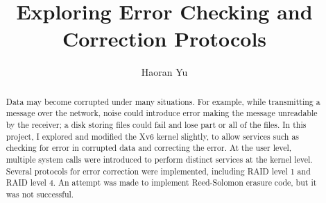 \documentclass[manuscript, review, screen]{acmart}
\begin{document}
\title{Exploring Error Checking and Correction Protocols} 


\author{Haoran Yu}



\begin{abstract}
Data may become corrupted under many situations. For example, while transmitting a message over the network, noise could introduce error making the message unreadable by the receiver; a disk storing files could fail and lose part or all of the files. In this project, I explored and modified the Xv6 kernel slightly, to allow services such as checking for error in corrupted data and correcting the error. At the user level, multiple system calls were introduced to perform distinct services at the kernel level. Several protocols for error correction were implemented, including RAID level 1 and RAID level 4. An attempt was made to implement Reed-Solomon erasure code, but it was not successful.
\end{abstract}


%
%



%
%




\maketitle



\end{document}
